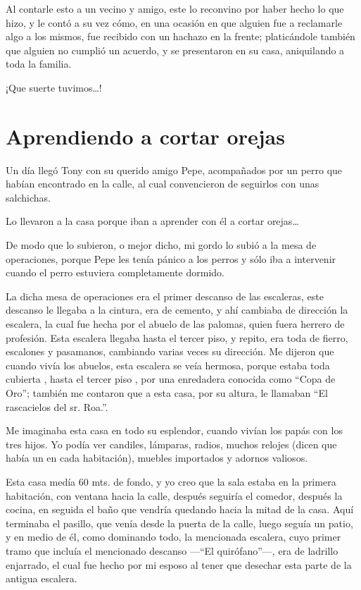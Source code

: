 \documentclass[letterpaper, 12pt]{book}
\begin{document}
Al contarle esto a un vecino y amigo, este lo reconvino por haber hecho lo que hizo, y le contó a su vez cómo, en una ocasión en que alguien fue a reclamarle algo a los mismos, fue recibido con un hachazo en la frente; platicándole también que alguien no cumplió un acuerdo, y se presentaron en su casa, aniquilando a toda la familia.

¡Que suerte tuvimos\ldots!
\chapter{Aprendiendo a cortar orejas}
Un día llegó Tony con su querido amigo Pepe, acompañados por un perro que habían encontrado en la calle, al cual convencieron de seguirlos con unas salchichas.

Lo llevaron a la casa porque iban a aprender con él a cortar orejas\ldots

De modo que lo subieron, o mejor dicho, mi gordo lo subió a la mesa de operaciones, porque Pepe les tenía pánico a los perros y sólo iba a intervenir cuando el perro estuviera completamente dormido.

La dicha mesa de operaciones era el primer descanso de las escaleras, este descanso le llegaba a la cintura, era de cemento, y ahí cambiaba de dirección la escalera, la cual fue hecha por el abuelo de las palomas, quien fuera herrero de profesión. Esta escalera llegaba hasta el tercer piso, y repito, era toda de fierro, escalones y pasamanos, cambiando varias veces su dirección. Me dijeron que cuando vivía los abuelos, esta escalera se veía hermosa, porque estaba toda cubierta , hasta el tercer piso , por una enredadera conocida como ``Copa de Oro''; también me contaron que a esta casa, por su altura, le llamaban ``El rascacielos del sr.  Roa.''. 

Me imaginaba  esta casa en todo su esplendor, cuando vivían los papás con los tres hijos. Yo podía ver candiles, lámparas, radios, muchos relojes (dicen que había un en cada habitación), muebles importados y adornos valiosos.

Esta casa medía 60 mts. de fondo, y yo creo que la sala estaba en la primera habitación, con ventana hacia la calle, después seguiría el comedor, después la cocina, en seguida el baño que vendría quedando hacia la mitad de la casa. Aquí terminaba el pasillo, que venía desde la puerta de la calle, luego seguía un patio, y en medio de él, como dominando todo, la mencionada escalera, cuyo primer tramo que incluía el mencionado descanso ---``El quirófano''---, era de ladrillo enjarrado, el cual fue hecho por mi esposo al tener que desechar esta parte de la antigua escalera.
\end{document}
